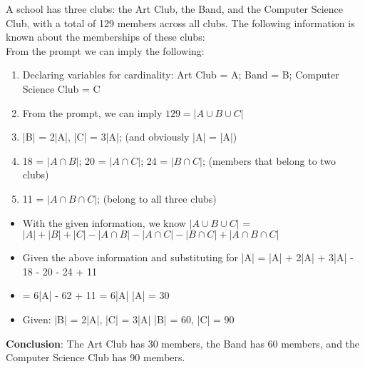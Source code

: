 \documentclass[11pt]{article}
\newcounter{prnum}
\newenvironment{problem}{{\vskip 0.2in\noindent\bf Problem
       \addtocounter{prnum}{1} \arabic{prnum}.}}{\vskip 0.1in}
\begin{document}

\begin{problem} 
A school has three clubs: the Art Club, the Band, and the Computer Science Club, with a total of 129 members across all clubs. The following information is known about the memberships of these clubs:
\\ 

  From the prompt we can imply the following:
\begin{enumerate}
  \item Declaring variables for cardinality: Art Club = A; Band = B; Computer Science Club = C
  \item From the prompt, we can imply $129 = |A \cup B \cup C|$
  \item |B| = 2|A|, |C| = 3|A|; (and obviously |A| = |A|)
  \item 18 = $|A \cap B|$; 20 = $|A \cap C|$; 24 = $|B \cap C|$; (members that belong to two clubs)
  \item 11 = $|A \cap B \cap C|$; (belong to all three clubs)
\end{enumerate}
\begin{itemize}
  \item With the given information, we know $|A \cup B \cup C|$ = $|A| + |B| + |C| - |A \cap B| - |A \cap C| - |B \cap C| + |A \cap B \cap C|$
  \item Given the above information and substituting for |A|
     = |A| + 2|A| + 3|A| - 18 - 20 - 24 + 11 
  \item {} = 6|A| - 62 + 11  = 6|A| \Rightarrow |A| = 30
  \item Given: |B| = 2|A|, |C| = 3|A| \Rightarrow |B| = 60, |C| = 90
\end{itemize}

\textbf{Conclusion}: The Art Club has 30 members, the Band has 60 members, and the Computer Science Club has 90 members.
\end{problem}
\pagebreak
\end{document}
